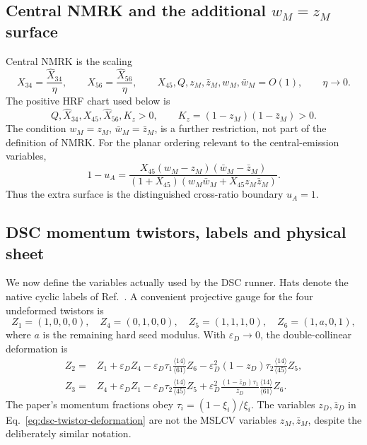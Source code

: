 \documentclass[11pt]{article}
\newcommand{\hX}{\widehat X}
\begin{document}
\subsection{Central NMRK and the additional \texorpdfstring{\(w_M=z_M\)}{wM=zM} surface}

Central NMRK is the scaling
\begin{equation}
 X_{34}=\frac{\hX_{34}}{\eta},\qquad
 X_{56}=\frac{\hX_{56}}{\eta},\qquad
 X_{45},Q,z_M,\bar z_M,w_M,\bar w_M=O(1),\qquad \eta\to0.
 \label{eq:nmrk-scaling}
\end{equation}
The positive HRF chart used below is
\begin{equation}
 Q,\hX_{34},X_{45},\hX_{56},K_z>0,\qquad
 K_z=(1-z_M)(1-\bar z_M)>0.
 \label{eq:nmrk-domain}
\end{equation}
The condition \(w_M=z_M\), \(\bar w_M=\bar z_M\), is a further restriction,
not part of the definition of NMRK.  For the planar ordering relevant to the
central-emission variables,
\begin{equation}
 1-u_A=\frac{X_{45}(w_M-z_M)(\bar w_M-\bar z_M)}
 {(1+X_{45})(w_M\bar w_M+X_{45}z_M\bar z_M)}.
 \label{eq:uA}
\end{equation}
Thus the extra surface is the distinguished cross-ratio boundary \(u_A=1\).

\subsection{DSC momentum twistors, labels and physical sheet}

We now define the variables actually used by the DSC runner.  Hats denote
the native cyclic labels of Ref.~\cite{Duhr:2025lyg}.  A convenient
projective gauge for the four undeformed twistors is
\begin{equation}
 Z_1=(1,0,0,0),\quad Z_4=(0,1,0,0),\quad
 Z_5=(1,1,1,0),\quad Z_6=(1,a,0,1),
 \label{eq:dsc-seed-twistors}
\end{equation}
where \(a\) is the remaining hard seed modulus.  With
\(\varepsilon_D\to0\), the double-collinear deformation is
\begin{align}
Z_2={}&Z_1+\varepsilon_D Z_4
-\varepsilon_D\tau_1\frac{\langle14\rangle}{\langle61\rangle}Z_6
-\varepsilon_D^2(1-z_D)\tau_2
 \frac{\langle14\rangle}{\langle45\rangle}Z_5,
\nonumber\\
Z_3={}&Z_4+\varepsilon_D Z_1
-\varepsilon_D\tau_2\frac{\langle14\rangle}{\langle45\rangle}Z_5
+\varepsilon_D^2\frac{(1-\bar z_D)\tau_1}{\bar z_D}
 \frac{\langle14\rangle}{\langle61\rangle}Z_6.
\label{eq:dsc-twistor-deformation}
\end{align}
The paper's momentum fractions obey
\(\tau_i=(1-\xi_i)/\xi_i\).  The variables \(z_D,\bar z_D\) in
Eq.~\eqref{eq:dsc-twistor-deformation} are not the MSLCV variables
\(z_M,\bar z_M\), despite the deliberately similar notation.
\end{document}

